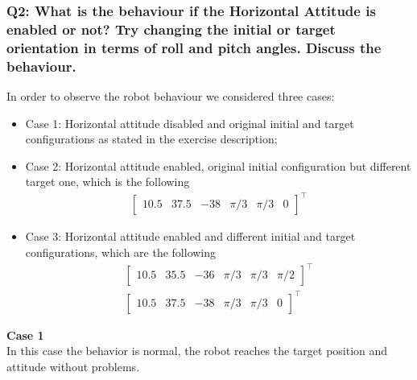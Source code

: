 \documentclass{article}
\begin{document}
\subsubsection{Q2: What is the behaviour if the Horizontal Attitude is enabled or not? Try changing the initial or target orientation in terms of roll and pitch angles. Discuss the behaviour.}
In order to observe the robot behaviour we considered three cases:
\begin{itemize}
	\item Case 1: Horizontal attitude disabled and original initial and target configurations as stated in the exercise description;
	\item Case 2: Horizontal attitude enabled, original initial configuration but different target one, which is the following 
	\begin{gather*}
		\begin{bmatrix} 10.5 & 37.5 & -38 & \pi/3 & \pi/3 & 0\end{bmatrix}^\top
	\end{gather*}
	\item Case 3: Horizontal attitude enabled and different initial and target configurations, which are the following 
	\begin{gather*}
		\begin{bmatrix} 10.5 & 35.5 & -36 & \pi/3 & \pi/3 & \pi/2\end{bmatrix}^\top \\
		\begin{bmatrix} 10.5 & 37.5 & -38 & \pi/3 & \pi/3 & 0\end{bmatrix}^\top
	\end{gather*}
\end{itemize}

{\large \textbf{Case 1}} \\
In this case the behavior is normal, the robot reaches the target position and attitude without problems.
\end{document}
